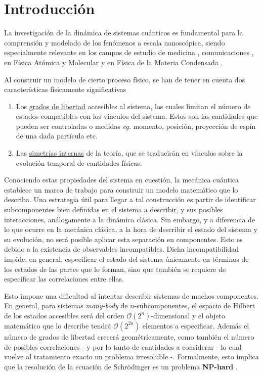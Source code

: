\documentclass{report} %
\newcommand{\eg}{\textit{eg. }}
\numberwithin{equation}{section}
\begin{document}
\chapter{Introducci\'on}

La investigación de la dinámica de sistemas cuánticos es fundamental para la comprensión y modelado de los fenómenos a escala nanoscópica, siendo especialmente relevante en los campos de estudio de medicina \cite{PCHP.10}, comunicaciones  \cite{Caldeira1981, Chirolli2008, Burkard2009, Tan2011}, en Física Atómica y Molecular y en Física de la Materia Condensada \cite{Zhou2017, Breuer2016,HOPS,TEDOPA,DAMPF,Farina2019}.

Al construir un modelo de cierto proceso físico, se han de tener en cuenta dos características físicamente significativas

\begin{enumerate}
    \item Los \underline{grados de libertad} accesibles al sistema, los cuales limitan el número de estados compatibles con los vínculos del sistema. Estos son las cantidades que pueden ser controladas o medidas \eg momento, posición, proyección de espín de una dada partícula etc.
    \item Las \underline{simetrías internas} de la teoría, que se traducirán en vínculos sobre la evolución temporal de cantidades físicas.
\end{enumerate}

Conociendo estas propiedades del sistema en cuestión, la mecánica cuántica establece un marco de trabajo para construir un modelo matemático que lo describa. Una estrategia útil para llegar a tal construcción es partir de identificar subcomponentes bien definidas en el sistema a describir, y sus posibles interacciones, análogamente a la dinámica clásica. Sin embargo, y a diferencia de lo que ocurre en la mecánica clásica, a la hora de describir el estado del sistema y su evolución, no será posible aplicar esta separación en componentes. Esto es debido a la existencia de observables incompatibles. Dicha incompatibilidad impide, en general, especificar el estado del sistema únicamente en términos de los estados de las partes que lo forman, sino que también se requiere de especificar las correlaciones entre ellas. 

Esto impone una dificultad al intentar describir sistemas de muchos componentes.
En general, para sistemas \textit{many-body} de $n$-subcomponentes, el espacio de Hilbert de los estados accesibles será del orden $\mathcal{O}(2^n)$-dimensional y el objeto matemático que lo describe tendrá $\mathcal{O}(2^{2n})$ elementos a especificar. Además el número de grados de libertad crecerá geométricamente, como también el número de posibles correlaciones - y por lo tanto de  cantidades a considerar - lo cual vuelve al tratamiento exacto un problema irresoluble -. Formalmente, esto implica que la resolución de la ecuación de Schrödinger es un problema \textbf{NP-hard} \cite{bolotin2013computational, bolotin2014computational}.
\end{document}
